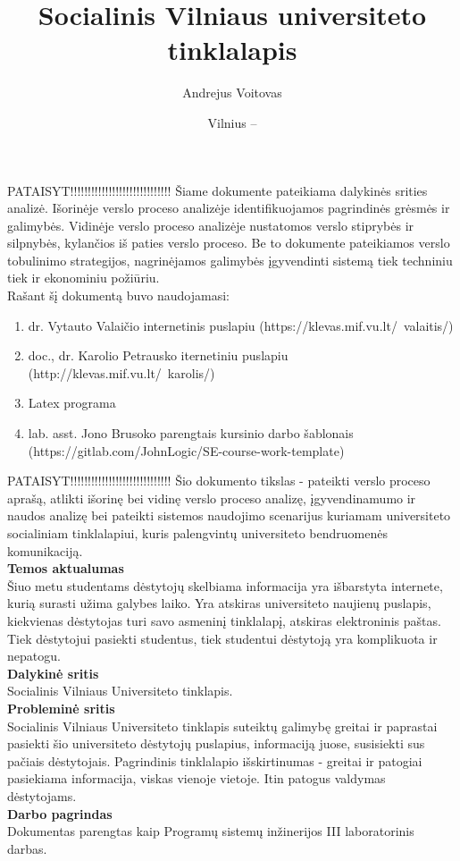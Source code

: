 \documentclass{VUMIFPSkursinis}
\title{Socialinis Vilniaus universiteto tinklalapis}
\author{Andrejus Voitovas}
\date{Vilnius – \the\year}
\begin{document}
\maketitle
\cleardoublepage{}
\setcounter{page}{2}
PATAISYT!!!!!!!!!!!!!!!!!!!!!!!!!!!!!
Šiame dokumente pateikiama dalykinės srities analizė. Išorinėje verslo proceso analizėje identifikuojamos pagrindinės grėsmės ir galimybės. Vidinėje verslo proceso analizėje nustatomos verslo stiprybės ir silpnybės, kylančios iš paties verslo proceso. Be to dokumente pateikiamos verslo tobulinimo strategijos, nagrinėjamos galimybės įgyvendinti sistemą tiek techniniu tiek ir ekonominiu požiūriu.\\
Rašant šį dokumentą buvo naudojamasi:
\begin{enumerate}
	\item dr. Vytauto Valaičio internetinis puslapiu (https://klevas.mif.vu.lt/~valaitis/) 
	\item doc., dr. Karolio Petrausko iternetiniu puslapiu (http://klevas.mif.vu.lt/~karolis/) 
	\item Latex programa
	\item lab. asst. Jono Brusoko parengtais kursinio darbo šablonais (https://gitlab.com/JohnLogic/SE-course-work-template)
	
\end{enumerate}
\newpage
\tableofcontents

PATAISYT!!!!!!!!!!!!!!!!!!!!!!!!!!!!!
Šio dokumento tikslas - pateikti verslo proceso aprašą, atlikti išorinę bei vidinę verslo proceso analizę, įgyvendinamumo ir naudos analizę bei pateikti sistemos naudojimo scenarijus kuriamam universiteto socialiniam tinklalapiui, kuris palengvintų universiteto bendruomenės komunikaciją.\\
\textbf{Temos aktualumas} \\
Šiuo metu studentams dėstytojų skelbiama informacija yra išbarstyta internete, kurią surasti užima galybes laiko. Yra atskiras universiteto naujienų puslapis, kiekvienas dėstytojas turi savo asmeninį tinklalapį, atskiras elektroninis paštas. Tiek dėstytojui pasiekti studentus, tiek studentui dėstytoją yra komplikuota ir nepatogu.\\
\textbf{Dalykinė sritis}\\
Socialinis Vilniaus Universiteto tinklapis.\\
 \textbf{Probleminė sritis}\\
Socialinis Vilniaus Universiteto tinklapis suteiktų galimybę greitai ir paprastai pasiekti šio universiteto dėstytojų puslapius, informaciją juose, susisiekti sus pačiais dėstytojais. Pagrindinis tinklalapio išskirtinumas - greitai ir patogiai pasiekiama informacija, viskas vienoje vietoje. Itin patogus valdymas dėstytojams.\\
 \textbf{Darbo pagrindas} \\ 
Dokumentas parengtas kaip Programų sistemų inžinerijos III laboratorinis darbas.
\newpage
\end{document}
